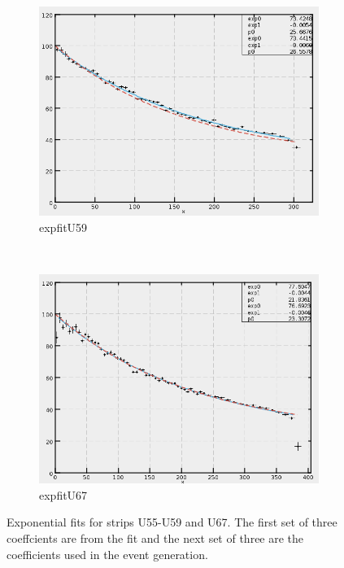 \begin{figure}[h]
    \begin{subfigure}[h]{0.44\textwidth}
        \centering
        \includegraphics[width=\textwidth, keepaspectratio = true]{expfit_U59}
        \caption{expfitU59}
        \label{fig:expfit_U59}
    \end{subfigure}
    ~
    \begin{subfigure}[h]{0.44\textwidth}
        \centering
        \includegraphics[width=\textwidth, keepaspectratio = true]{expfit_U67}
        \caption{expfitU67}
        \label{fig:expfit_U67}
    \end{subfigure}
    \caption{Exponential fits for strips U55-U59 and U67. The first set of three coeffcients are from the fit and the next set of three are
     the coefficients used in the event generation.}
    \label{fig:expfit2}
\end{figure}
\FloatBarrier

